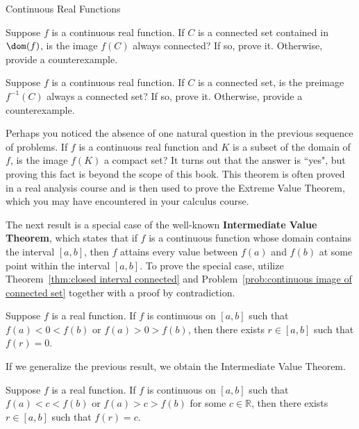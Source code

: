 \begin{section}{Continuous Real Functions}


\begin{problem}\label{prob:continuous image of connected set}
Suppose $f$ is a continuous real function. If $C$ is a connected set contained in $\dom(f)$, is the image $f(C)$ always connected?  If so, prove it.  Otherwise, provide a counterexample.
\end{problem}

\begin{problem}
Suppose $f$ is a continuous real function. If $C$ is a connected set, is the preimage $f^{-1}(C)$ always a connected set? If so, prove it.  Otherwise, provide a counterexample.
\end{problem}

Perhaps you noticed the absence of one natural question in the previous sequence of problems. If $f$ is a continuous real function and $K$ is a subset of the domain of $f$, is the image $f(K)$ a compact set?  It turns out that the answer is ``yes", but proving this fact is beyond the scope of this book. This theorem is often proved in a real analysis course and is then used to prove the Extreme Value Theorem, which you may have encountered in your calculus course.

The next result is a special case of the well-known \textbf{Intermediate Value Theorem}, which states that if $f$ is a continuous function whose domain contains the interval $[a,b]$, then $f$ attains every value between $f(a)$ and $f(b)$ at some point within the interval $[a,b]$. To prove the special case, utilize Theorem~\ref{thm:closed interval connected} and Problem~\ref{prob:continuous image of connected set} together with a proof by contradiction.

\begin{theorem}
Suppose $f$ is a real function. If $f$ is continuous on $[a,b]$ such that $f(a)<0<f(b)$ or $f(a)>0>f(b)$, then there exists $r\in [a,b]$ such that $f(r)=0$.
\end{theorem}

If we generalize the previous result, we obtain the Intermediate Value Theorem.

\begin{theorem}
Suppose $f$ is a real function. If $f$ is continuous on $[a,b]$ such that $f(a)<c<f(b)$ or $f(a)>c>f(b)$ for some $c\in \mathbb{R}$, then there exists $r\in [a,b]$ such that $f(r)=c$.
\end{theorem}


\end{section}
